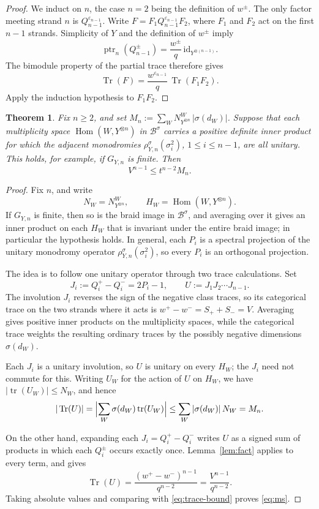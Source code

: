 \documentclass[11pt,oneside]{amsart}
\newtheorem{theorem}{Theorem}[section]
\theoremstyle{remark}
\newcommand{\Tr}{\operatorname{Tr}}
\newcommand{\tr}{\operatorname{tr}}
\newcommand{\ptr}{\operatorname{ptr}}
\newcommand{\Hom}{\operatorname{Hom}}
\begin{document}
\begin{proof}
We induct on $n$, the case $n=2$ being the definition of $w^\pm$. The only
factor meeting strand $n$ is $Q_{n-1}^{\varepsilon_{n-1}}$. Write
$F=F_1Q_{n-1}^{\varepsilon_{n-1}}F_2$, where $F_1$ and $F_2$ act on the first
$n-1$ strands. Simplicity of $Y$ and the definition of $w^\pm$ imply
\[
\ptr_n(Q_{n-1}^{\pm})=\frac{w^\pm}{q}\,
\mathrm{id}_{Y^{\otimes(n-1)}}.
\]
The bimodule property of the partial trace therefore gives
\[
\Tr(F)=\frac{w^{\varepsilon_{n-1}}}{q}\,\Tr(F_1F_2).
\]
Apply the induction hypothesis to $F_1F_2$.
\end{proof}

\begin{theorem}\label{thm:ms}
Fix $n\ge2$, and set $M_n:=\sum_WN_{Y^{\otimes n}}^W\,|\sigma(d_W)|$. Suppose that
each multiplicity space $\Hom(W,Y^{\otimes n})$ in $\mathcal B^\sigma$ carries a
positive definite inner product for which the adjacent monodromies
$\rho^\sigma_{Y,n}(\sigma_i^2)$, $1\le i\le n-1$, are all unitary. This holds,
for example, if $G_{Y,n}$ is finite. Then
\begin{equation}\label{eq:ms}
V^{n-1}\le t^{n-2}M_n.
\end{equation}
\end{theorem}

\begin{proof}
Fix $n$, and write
\[
N_W=N^W_{Y^{\otimes n}},\qquad H_W=\Hom(W,Y^{\otimes n}).
\]
If $G_{Y,n}$ is finite, then so is the braid image in $\mathcal B^\sigma$, and
averaging over it gives an inner product on each $H_W$ that is invariant under
the entire braid image; in particular the hypothesis holds. In general, each
$P_i$ is a spectral projection of the unitary monodromy operator
$\rho^\sigma_{Y,n}(\sigma_i^2)$, so every $P_i$ is an orthogonal projection.

The idea is to follow one unitary operator through two trace calculations. Set
\[
J_i:=Q_i^+-Q_i^-=2P_i-1,\qquad U:=J_1J_2\cdots J_{n-1}.
\]
The involution $J_i$ reverses the sign of the negative class traces, so its
categorical trace on the two strands where it acts is $w^+-w^-=S_++S_-=V$.
Averaging gives positive inner products on the multiplicity spaces, while the
categorical trace weights the resulting ordinary traces by the possibly negative
dimensions $\sigma(d_W)$.

Each $J_i$ is a unitary involution, so $U$ is unitary on every $H_W$; the $J_i$
need not commute for this. Writing $U_W$ for the action of $U$ on $H_W$, we have
$|\tr(U_W)|\le N_W$, and hence
\begin{equation}\label{eq:trace-bound}
|\Tr(U)|=\Bigl|\sum_W\sigma(d_W)\tr(U_W)\Bigr|
\le\sum_W|\sigma(d_W)|\,N_W=M_n.
\end{equation}

On the other hand, expanding each $J_i=Q_i^+-Q_i^-$ writes $U$ as a signed sum
of products in which each $Q_i^{\pm}$ occurs exactly once. Lemma~\ref{lem:fact}
applies to every term, and gives
\[
\Tr(U)=\frac{(w^+-w^-)^{n-1}}{q^{n-2}}=\frac{V^{n-1}}{q^{n-2}}.
\]
Taking absolute values and comparing with \eqref{eq:trace-bound} proves
\eqref{eq:ms}.
\end{proof}
\end{document}
